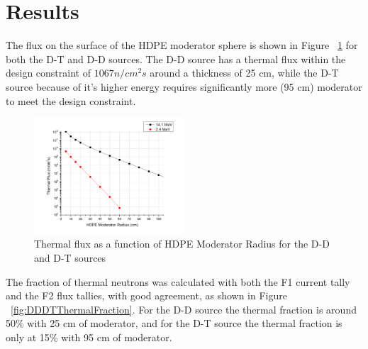 \documentclass[draftcls,onecolumn]{IEEEtran}
\begin{document}
\section{Results}
The flux on the surface of the HDPE moderator sphere is shown in Figure ~\ref{fig:ThermalFluxSources} for both the D-T and D-D sources. The D-D source has a thermal flux within the design constraint of $106{7} n/cm^2s$ around a thickness of 25 cm, while the D-T source because of it's higher energy requires significantly more (95 cm) moderator to meet the design constraint.
\begin{figure}[ht]
    \centering
    \includegraphics[width=0.5\textwidth]{ThermalFluxSources}
    \caption{Thermal flux as a function of HDPE Moderator Radius for the D-D and D-T sources}
    \label{fig:ThermalFluxSources}
\end{figure}
The fraction of thermal neutrons was calculated with both the F1 current tally and the F2 flux tallies, with good agreement, as shown in Figure ~\ref{fig:DDDTThermalFraction}. 
For the D-D source the thermal fraction is around 50\% with 25 cm of moderator, and for the D-T source the thermal fraction is only at 15\% with 95 cm of moderator.
\end{document}
